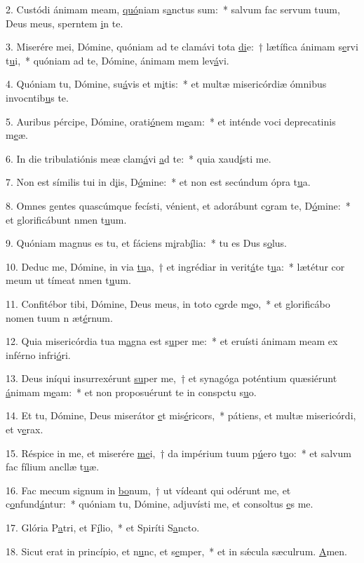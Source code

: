 2. Custódi ánimam meam, \uline{quó}niam s\uline{a}nctus sum:~* salvum fac servum tuum, Deus meus, sperntem \uline{i}n te.\par 
3. Miserére mei, Dómine, quóniam ad te clamávi tota \uline{di}e:~† lætífica ánimam s\uline{e}rvi t\uline{u}i,~* quóniam ad te, Dómine, ánimam mem lev\uline{á}vi.\par 
4. Quóniam tu, Dómine, su\uline{á}vis et m\uline{i}tis:~* et multæ misericórdiæ ómnibus invocntib\uline{u}s te.\par 
5. Auribus pércipe, Dómine, orati\uline{ó}nem m\uline{e}am:~* et inténde voci deprecatinis m\uline{e}æ.\par 
6. In die tribulatiónis meæ clam\uline{á}vi \uline{a}d te:~* quia xaud\uline{í}sti me.\par 
7. Non est símilis tui in d\uline{i}is, D\uline{ó}mine:~* et non est secúndum ópra t\uline{u}a.\par 
8. Omnes gentes quascúmque fecísti, vénient, et adorábunt c\uline{o}ram te, D\uline{ó}mine:~* et glorificábunt nmen t\uline{u}um.\par 
9. Quóniam magnus es tu, et fáciens m\uline{i}rab\uline{í}lia:~* tu es Dus s\uline{o}lus.\par 
10. Deduc me, Dómine, in via \uline{tu}a,~† et ingrédiar in verit\uline{á}te t\uline{u}a:~* lætétur cor meum ut tímeat nmen t\uline{u}um.\par 
11. Confitébor tibi, Dómine, Deus meus, in toto c\uline{o}rde m\uline{e}o,~* et glorificábo nomen tuum n æt\uline{é}rnum.\par 
12. Quia misericórdia tua m\uline{a}gna est s\uline{u}per me:~* et eruísti ánimam meam ex inférno infri\uline{ó}ri.\par 
13. Deus iníqui insurrexérunt \uline{su}per me,~† et synagóga poténtium quæsiérunt \uline{á}nimam m\uline{e}am:~* et non proposuérunt te in conspctu s\uline{u}o.\par 
14. Et tu, Dómine, Deus miserátor \uline{e}t mis\uline{é}ricors,~* pátiens, et multæ misericórdi, et v\uline{e}rax.\par 
15. Réspice in me, et miserére \uline{me}i,~† da impérium tuum p\uline{ú}ero t\uline{u}o:~* et salvum fac fílium ancllæ t\uline{u}æ.\par 
16. Fac mecum signum in \uline{bo}num,~† ut vídeant qui odérunt me, et c\uline{o}nfund\uline{á}ntur:~* quóniam tu, Dómine, adjuvísti me, et consoltus \uline{e}s me.\par 
17. Glória P\uline{a}tri, et F\uline{í}lio,~* et Spiríti S\uline{a}ncto.\par 
18. Sicut erat in princípio, et n\uline{u}nc, et s\uline{e}mper,~* et in sǽcula sæculrum. \uline{A}men.\par 
